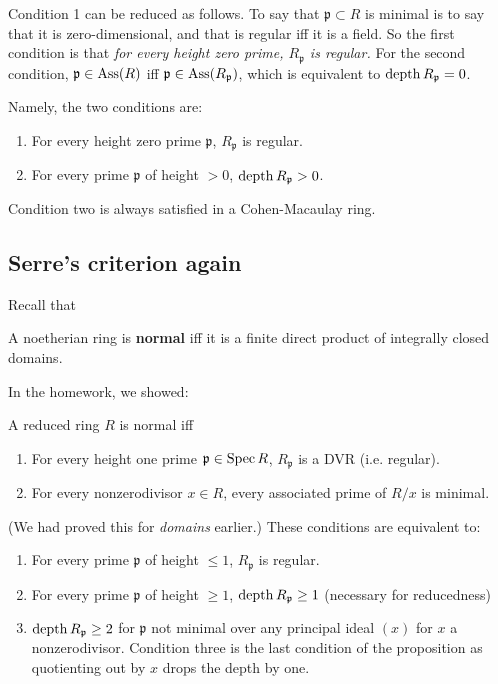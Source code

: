 Condition 1 can be reduced as follows. To say that
$\mathfrak{p}\subset R$ is
minimal is to say that it is zero-dimensional, and that is
regular iff it is a
field. So the first condition is that \emph{for every height
zero prime,
$R_{\mathfrak{p}}$ is regular.} For the second condition,
$\mathfrak{p} \in
\operatorname{Ass}(R)$ iff $\mathfrak{p} \in \operatorname{Ass}(R_{\mathfrak{p}})$, which is
equivalent to
$\operatorname{depth} R_{\mathfrak{p}} = 0$.

Namely, the two conditions are:
\begin{enumerate}
\item For every height zero prime $\mathfrak{p} $,
$R_{\mathfrak{p}}$ is
regular.
\item For every prime $\mathfrak{p}$ of height $>0$, $\operatorname{depth}
R_{\mathfrak{p}} >
0$.
\end{enumerate}

Condition two is always satisfied in a Cohen-Macaulay ring.

\subsection{Serre's criterion again}

Recall that
\begin{definition}
A noetherian ring is \textbf{normal} iff it is a finite direct
product of
integrally closed domains.
\end{definition}

In the homework, we showed:
\begin{proposition}
A reduced ring $R$ is normal iff
\begin{enumerate}
\item For every height one prime $\mathfrak{p}  \in \operatorname{Spec} R$,
$R_{\mathfrak{p}}$ is a DVR (i.e. regular).
\item For every nonzerodivisor $x \in R$, every associated prime
of $R/x$ is
minimal.
\end{enumerate}
\end{proposition}
(We had proved this for \emph{domains} earlier.)
These conditions are equivalent to:
\begin{enumerate}
\item For every prime $\mathfrak{p}$ of height $\leq 1$,
$R_{\mathfrak{p}} $ is regular.
\item For every prime $\mathfrak{p}$ of height $\geq 1$,
$\operatorname{depth} R_{\mathfrak{p}} \geq 1$ (necessary for reducedness)
\item $\operatorname{depth} R_{\mathfrak{p}} \geq 2$ for $\mathfrak{p}$ not
minimal over any
principal ideal $(x)$ for $x$ a nonzerodivisor. Condition three
is the last
condition of the proposition as quotienting out by $x$ drops the
depth by one.
\end{enumerate}

